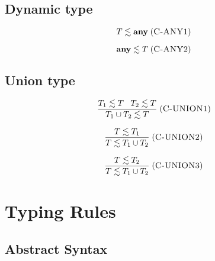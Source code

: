 \documentclass[12pt]{article}
\newcommand{\Any}{\mathbf{any}}
\newcommand{\mylabel}[1]{\; (\textsc{#1})}
\begin{document}
\subsection{Dynamic type}

\[
T \lesssim \Any
\mylabel{C-ANY1}
\]

\[
\Any \lesssim T
\mylabel{C-ANY2}
\]

\subsection{Union type}

\[
\frac{T_{1} \lesssim T \;\;\; T_{2} \lesssim T}
     {T_{1} \cup T_{2} \lesssim T}
\mylabel{C-UNION1}
\]

\[
\frac{T \lesssim T_{1}}
     {T \lesssim T_{1} \cup T_{2}}
\mylabel{C-UNION2}
\]

\[
\frac{T \lesssim T_{2}}
     {T \lesssim T_{1} \cup T_{2}}
\mylabel{C-UNION3}
\]

\section{Typing Rules}

\subsection{Abstract Syntax}
\end{document}
